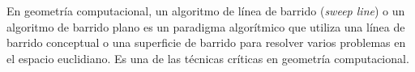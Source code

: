 En geometría computacional, un algoritmo de línea de barrido (\emph{sweep line}) o un algoritmo de barrido plano es un paradigma algorítmico que utiliza una línea de barrido conceptual o una superficie de barrido para resolver varios problemas en el espacio euclidiano. Es una de las técnicas críticas en geometría computacional.